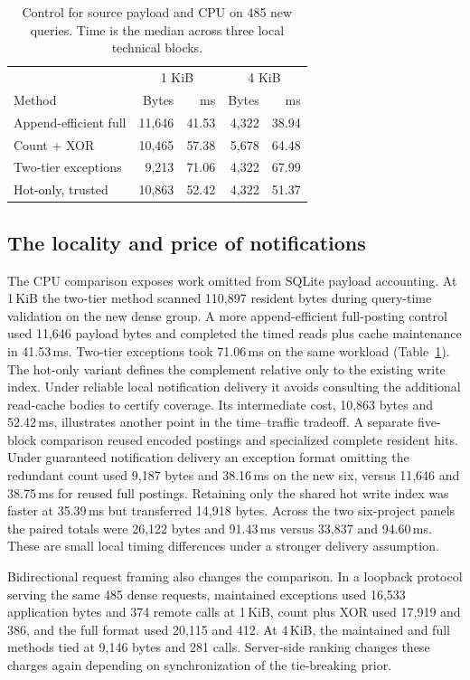 \documentclass[conference]{IEEEtran}
\begin{document}
\begin{table}[t]\centering
\caption{Control for source payload and CPU on 485 new queries. Time is the median across three local technical blocks.}\label{tab:cpu}
\begin{tabular}{lrrrr}\toprule
 & \multicolumn{2}{c}{1 KiB} & \multicolumn{2}{c}{4 KiB}\\
Method & Bytes & ms & Bytes & ms\\\midrule
Append-efficient full & 11,646 & 41.53 & 4,322 & 38.94\\
Count + XOR & 10,465 & 57.38 & 5,678 & 64.48\\
Two-tier exceptions & 9,213 & 71.06 & 4,322 & 67.99\\
Hot-only, trusted & 10,863 & 52.42 & 4,322 & 51.37\\\bottomrule
\end{tabular}
\end{table}

\subsection{The locality and price of notifications}
The CPU comparison exposes work omitted from SQLite payload accounting. At 1\,KiB the two-tier method scanned 110,897 resident bytes during query-time validation on the new dense group. A more append-efficient full-posting control used 11,646 payload bytes and completed the timed reads plus cache maintenance in 41.53\,ms. Two-tier exceptions took 71.06\,ms on the same workload (Table~\ref{tab:cpu}). The hot-only variant defines the complement relative only to the existing write index. Under reliable local notification delivery it avoids consulting the additional read-cache bodies to certify coverage. Its intermediate cost, 10,863 bytes and 52.42\,ms, illustrates another point in the time--traffic tradeoff. A separate five-block comparison reused encoded postings and specialized complete resident hits. Under guaranteed notification delivery an exception format omitting the redundant count used 9,187 bytes and 38.16\,ms on the new six, versus 11,646 and 38.75\,ms for reused full postings. Retaining only the shared hot write index was faster at 35.39\,ms but transferred 14,918 bytes. Across the two six-project panels the paired totals were 26,122 bytes and 91.43\,ms versus 33,837 and 94.60\,ms. These are small local timing differences under a stronger delivery assumption.

Bidirectional request framing also changes the comparison. In a loopback protocol serving the same 485 dense requests, maintained exceptions used 16,533 application bytes and 374 remote calls at 1\,KiB, count plus XOR used 17,919 and 386, and the full format used 20,115 and 412. At 4\,KiB, the maintained and full methods tied at 9,146 bytes and 281 calls. Server-side ranking changes these charges again depending on synchronization of the tie-breaking prior.
\end{document}
